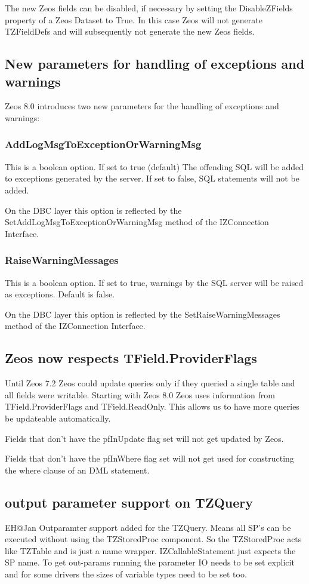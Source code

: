 \documentclass[a4paper,12pt,oneside]{article}
\begin{document}
The new Zeos fields can be disabled, if necessary by setting the DisableZFields property of a Zeos Dataset to True.
In this case Zeos will not generate TZFieldDefs and will subsequently not generate the new Zeos fields.

\subsection{New parameters for handling of exceptions and warnings}
Zeos 8.0 introduces two new parameters for the handling of exceptions and warnings:

\subsubsection{AddLogMsgToExceptionOrWarningMsg }
This is a boolean option.
If set to true (default) The offending SQL will be added to exceptions generated by the server.
If set to false, SQL statements will not be added.

On the DBC layer this option is reflected by the SetAddLogMsgToExceptionOrWarningMsg method of the IZConnection Interface.

\subsubsection{RaiseWarningMessages}
This is a boolean option.
If set to true, warnings by the SQL server will be raised as exceptions.
Default is false.

On the DBC layer this option is reflected by the SetRaiseWarningMessages method of the IZConnection Interface.

\subsection{Zeos now respects TField.ProviderFlags}
Until Zeos 7.2 Zeos could update queries only if they queried a single table and all fields were writable.
Starting with Zeos 8.0 Zeos uses information from TField.ProviderFlags and TField.ReadOnly.
This allows us to have more queries be updateable automatically.

Fields that don't have the pfInUpdate flag set will not get updated by Zeos.

Fields that don't have the pfInWhere flag set will not get used for constructing the where clause of an DML statement.

\subsection{output parameter support on TZQuery}
EH@Jan Outparamter support added for the TZQuery.
Means all SP's can be executed without using the TZStoredProc component.
So the TZStoredProc acts like TZTable and is just a name wrapper.
IZCallableStatement just expects the SP name.
To get out-params running the parameter IO needs to be set explicit and for some drivers the sizes of variable types need to be set too.
\end{document}
